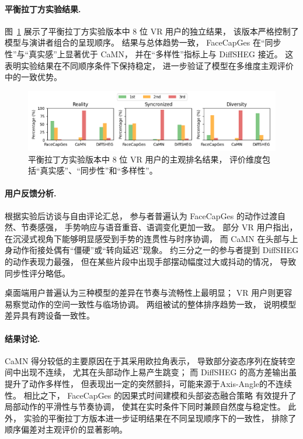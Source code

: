 \paragraph{平衡拉丁方实验结果.}
图~\ref{fig:userstudy_latin_square} 展示了平衡拉丁方实验版本中 8 位 VR 用户的独立结果，
该版本严格控制了模型与演讲者组合的呈现顺序。
结果与总体趋势一致，
FaceCapGes 在“同步性”与“真实感”上显著优于 CaMN，
并在“多样性”指标上与 DiffSHEG 接近。
这表明实验结果在不同顺序条件下保持稳定，
进一步验证了模型在多维度主观评价中的一致优势。

\begin{figure}[h!t]
\centering
\includegraphics[width=\linewidth]{figures/UserStudy_LatinSquare.png}
\caption{平衡拉丁方实验版本中 8 位 VR 用户的主观排名结果，
评价维度包括“真实感”、“同步性”和“多样性”。}
\label{fig:userstudy_latin_square}
\end{figure}

\paragraph{用户反馈分析.}
根据实验后访谈与自由评论汇总，
参与者普遍认为 FaceCapGes 的动作过渡自然、节奏感强，
手势响应与语音重音、语调变化更加一致。
部分 VR 用户指出，
在沉浸式视角下能够明显感受到手势的连贯性与时序协调，
而 CaMN 在头部与上身动作衔接处偶有“僵硬”或“转向延迟”现象。
约三分之一的参与者提到 DiffSHEG 的动作表现力最强，
但在某些片段中出现手部摆动幅度过大或抖动的情况，
导致同步性评分略低。

桌面端用户普遍认为三种模型的差异在节奏与流畅性上最明显；
VR 用户则更容易察觉动作的空间一致性与临场协调。
两组被试的整体排序趋势一致，
说明模型差异具有跨设备一致性。

\paragraph{结果讨论.}
CaMN 得分较低的主要原因在于其采用欧拉角表示，
导致部分姿态序列在旋转空间中出现不连续，
尤其在头部动作上易产生跳变；
而 DiffSHEG 的高方差输出虽提升了动作多样性，
但表现出一定的突然颤抖，可能来源于Axis-Angle的不连续性。
相比之下，
FaceCapGes 的因果式时间建模和头部姿态融合策略
有效提升了局部动作的平滑性与节奏协调，
使其在实时条件下同时兼顾自然度与稳定性。
此外，
实验的平衡拉丁方版本进一步证明结果在不同呈现顺序下的一致性，
排除了顺序偏差对主观评价的显著影响。

